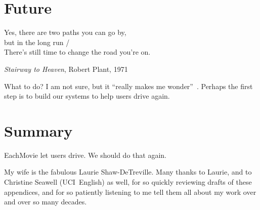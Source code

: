 \documentclass[nonacm,manuscript,screen,microtype={protrusion=true,expansion,kerning,spacing}]{acmart}
\begin{document}
\section{Future}
\epigraph{\raggedleft{} Yes, there are two paths you can go by, \\ but in the long run / \\ There's still time to change the road you're on.}{\textit{Stairway to Heaven}, Robert Plant, 1971}

What to do? I am not sure, but it ``really makes me wonder''~\cite{LedZeppelin1971Stairway}. Perhaps the first step is to build our systems to help users drive again.

\section{Summary}

EachMovie let users drive. We should do that again.

\begin{acks}
My wife is the fabulous Laurie Shaw-DeTreville. Many thanks to Laurie, and to Christine Seawell (UCI~English) as well, for so quickly reviewing drafts of these appendices, and for so patiently listening to me tell them all about my work over and over so many decades.
\end{acks}



\end{document}
